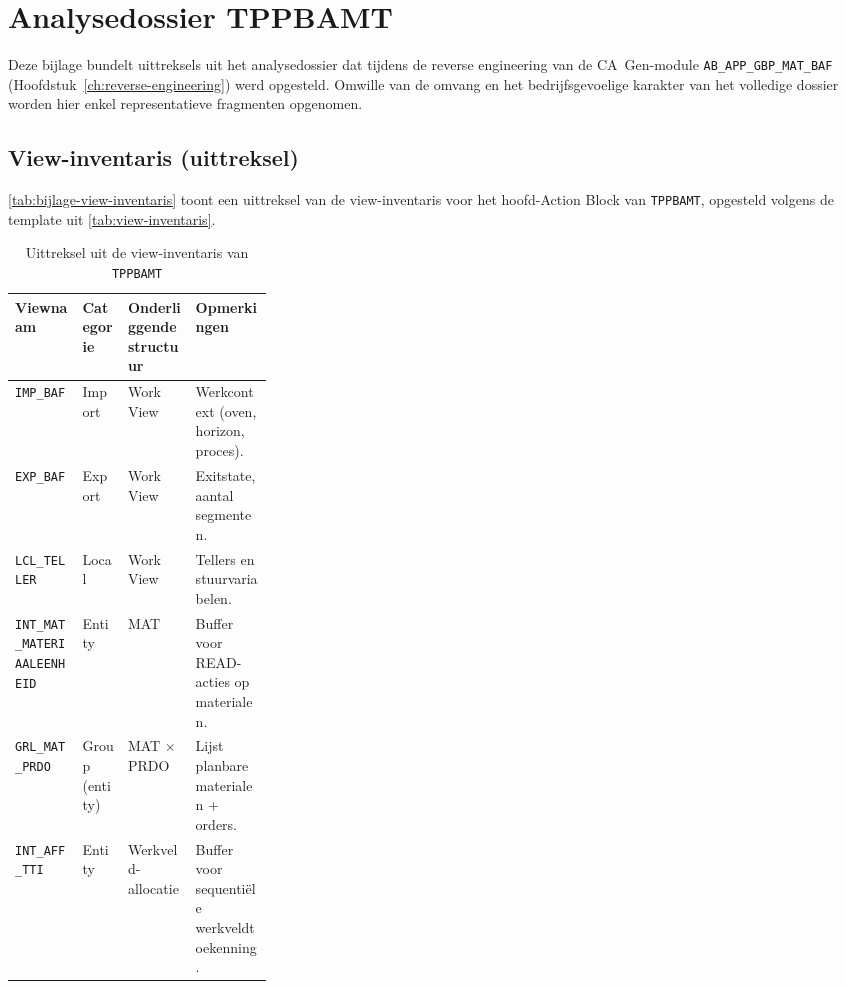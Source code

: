 
\chapter{Analysedossier TPPBAMT}%
\label{ch:bijlage-views}

Deze bijlage bundelt uittreksels uit het analysedossier dat tijdens de reverse engineering van de
CA~Gen-module \texttt{AB\_APP\_GBP\_MAT\_BAF} (Hoofdstuk~\ref{ch:reverse-engineering}) werd opgesteld. Omwille van de omvang
en het bedrijfsgevoelige karakter van het volledige dossier worden hier enkel representatieve fragmenten
opgenomen.

\section{View-inventaris (uittreksel)}
\label{sec:bijlage-view-inventaris}

\autoref{tab:bijlage-view-inventaris} toont een uittreksel van de view-inventaris voor het hoofd-Action
Block van \texttt{TPPBAMT}, opgesteld volgens de template uit \autoref{tab:view-inventaris}.

\begin{table}[h]
\centering
\caption[Uittreksel view-inventaris TPPBAMT]{Uittreksel uit de view-inventaris van \texttt{TPPBAMT}}
\label{tab:bijlage-view-inventaris}
\small
\begin{tabular}{|l|l|l|p{0.30\linewidth}|}
\hline
\textbf{Viewnaam} & \textbf{Categorie} & \textbf{Onderliggende structuur} & \textbf{Opmerkingen} \\
\hline
\texttt{IMP\_BAF} & Import & Work View & Werkcontext (oven, horizon, proces). \\
\hline
\texttt{EXP\_BAF} & Export & Work View & Exitstate, aantal segmenten. \\
\hline
\texttt{LCL\_TELLER} & Local & Work View & Tellers en stuurvariabelen. \\
\hline
\texttt{INT\_MAT\_MATERIAALEENHEID} & Entity & MAT & Buffer voor READ-acties op materialen. \\
\hline
\texttt{GRL\_MAT\_PRDO} & Group (entity) & MAT $\times$ PRDO & Lijst planbare materialen + orders. \\
\hline
\texttt{INT\_AFF\_TTI} & Entity & Werkveld-allocatie & Buffer voor sequenti\"ele werkveldtoekenning. \\
\hline
\end{tabular}
\end{table}

